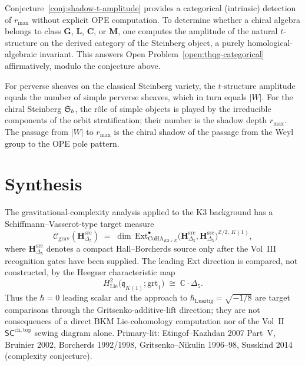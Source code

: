 \begin{remark}
Conjecture~\ref{conj:shadow-t-amplitude} provides a
categorical (intrinsic) detection of $r_{\max}$ without
explicit OPE computation. To determine whether a chiral
algebra belongs to class $\mathbf{G}$, $\mathbf{L}$,
$\mathbf{C}$, or $\mathbf{M}$, one computes the amplitude of the natural
$t$-structure on the derived category of the Steinberg
object, a purely homological-algebraic invariant.
This answers Open Problem~\ref{open:thqg-categorical}
affirmatively, modulo the conjecture above.
\end{remark}

\begin{remark}
For perverse sheaves on the classical Steinberg variety,
the $t$-structure amplitude equals the number of simple
perverse sheaves, which in turn equals $|W|$. For the
chiral Steinberg $\mathfrak{S}_b$, the r\^ole of simple
objects is played by the irreducible components of the
orbit stratification; their number is the shadow depth
$r_{\max}$. The passage from $|W|$ to $r_{\max}$ is the
chiral shadow of the passage from the Weyl group to the
OPE pole pattern.
\end{remark}

\section{Synthesis}
\label{sec:gravcomplex-supplement}

\begin{remark}
\label{rem:gravcomplex-1}
The gravitational-complexity analysis applied to the K3 background has
a Schiffmann--Vasserot-type target measure
\[
\mathcal C_{\mathrm{grav}}(\mathbf H_{\Delta_5}^{\mathrm{src}})
\;=\; \dim\, \mathrm{Ext}^\bullet_{\mathrm{CoHA}_{K3\times E}}
\bigl(\mathbf H_{\Delta_5}^{\mathrm{src}}, \mathbf H_{\Delta_5}^{\mathrm{src}}\bigr)^{\mathbb Z/2,\, K(1)},
\]
where $\mathbf H_{\Delta_5}^{\mathrm{src}}$ denotes a compact
Hall--Borcherds source only after the Vol~III recognition gates have
been supplied.  The leading Ext direction is compared, not constructed,
by the Heegner characteristic map
\[
H^2_{\mathrm{Lie}}\bigl(\mathfrak q_{K(1)};\mathrm{grt}_1\bigr)
\;\cong\; \mathbb C\cdot \Delta_5 .
\]
Thus the $\hbar=0$ leading scalar and the approach to
$\hbar_{\mathrm{Lusztig}}=\sqrt{-1/8}$ are target comparisons through
the Gritsenko-additive-lift direction; they are not consequences of a
direct BKM Lie-cohomology computation nor of the Vol~II
$\mathsf{SC}^{\mathrm{ch,top}}$ sewing diagram alone.  Primary-lit:
Etingof--Kazhdan 2007 Part~V, Bruinier 2002, Borcherds 1992/1998,
Gritsenko--Nikulin 1996--98, Susskind 2014 (complexity conjecture).
\end{remark}
